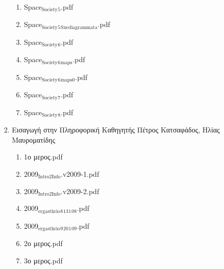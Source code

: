 \documentclass[11pt]{article}
\begin{document}
\begin{enumerate}
\begin{enumerate}
\begin{enumerate}
\begin{enumerate}
\begin{enumerate}
\item Space$_{\text{Society}}$$_{\text{5}}$.pdf
\label{sec-1-1-1-1-49-2-2-1-64-2-1-7}

\item Space$_{\text{Society}}$$_{\text{5}}$$_{\text{Sxediagrammata}}$.pdf
\label{sec-1-1-1-1-49-2-2-1-64-2-1-8}

\item Space$_{\text{Society}}$$_{\text{6}}$.pdf
\label{sec-1-1-1-1-49-2-2-1-64-2-1-9}

\item Space$_{\text{Society}}$$_{\text{6}}$$_{\text{maps}}$.pdf
\label{sec-1-1-1-1-49-2-2-1-64-2-1-10}

\item Space$_{\text{Society}}$$_{\text{6}}$$_{\text{maps0}}$.pdf
\label{sec-1-1-1-1-49-2-2-1-64-2-1-11}

\item Space$_{\text{Society}}$$_{\text{7}}$.pdf
\label{sec-1-1-1-1-49-2-2-1-64-2-1-12}

\item Space$_{\text{Society}}$$_{\text{8}}$.pdf
\label{sec-1-1-1-1-49-2-2-1-64-2-1-13}
\end{enumerate}

\item Εισαγωγή στην Πληροφορική Καθηγητής Πέτρος Κατσαφάδος, Ηλίας Μαυροματίδης
\label{sec-1-1-1-1-49-2-2-1-64-2-2}
\begin{enumerate}
\item 1ο μερος.pdf
\label{sec-1-1-1-1-49-2-2-1-64-2-2-1}

\item 2009$_{\text{Intro2Info}}$.v2009-1.pdf
\label{sec-1-1-1-1-49-2-2-1-64-2-2-2}

\item 2009$_{\text{Intro2Info}}$.v2009-2.pdf
\label{sec-1-1-1-1-49-2-2-1-64-2-2-3}

\item 2009$_{\text{ergasthrio}}$$_{\text{8}}$$_{\text{13}}$$_{\text{1}}$$_{\text{08}}$.pdf
\label{sec-1-1-1-1-49-2-2-1-64-2-2-4}

\item 2009$_{\text{ergasthrio}}$$_{\text{9}}$$_{\text{20}}$$_{\text{1}}$$_{\text{09}}$.pdf
\label{sec-1-1-1-1-49-2-2-1-64-2-2-5}

\item 2ο μερος.pdf
\label{sec-1-1-1-1-49-2-2-1-64-2-2-6}

\item 3ο μερος.pdf
\label{sec-1-1-1-1-49-2-2-1-64-2-2-7}


\end{enumerate}
\end{enumerate}
\end{enumerate}
\end{enumerate}
\end{enumerate}
\end{document}
